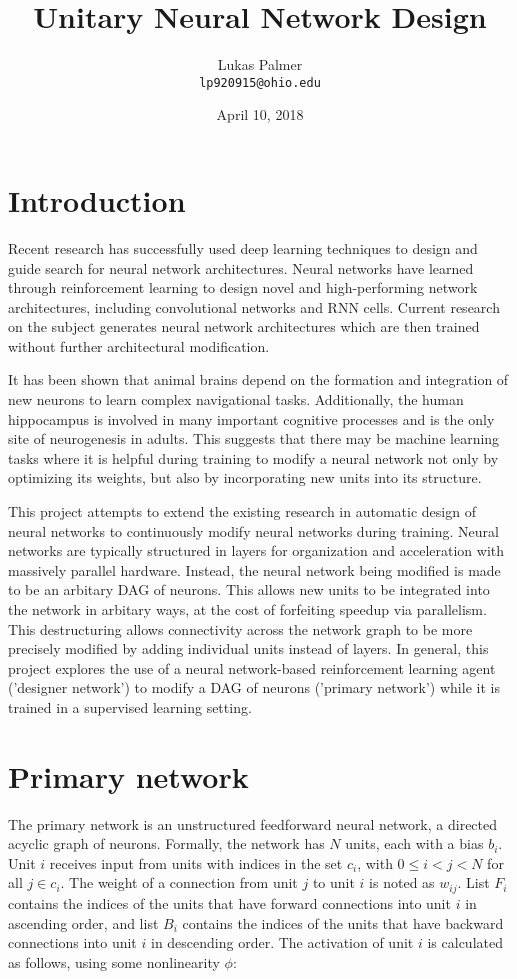 \documentclass{article}[12px]
\title{Unitary Neural Network Design}
\author{Lukas Palmer \\ \texttt{lp920915@ohio.edu}}
\date{April 10, 2018}
\begin{document}
\maketitle

\section{Introduction}

Recent research has successfully used deep learning techniques to design and guide search for neural network architectures. Neural networks have learned through reinforcement learning to design novel and high-performing network architectures, including convolutional networks and RNN cells\cite{DBLP:journals/corr/ZophL16}. Current research on the subject generates neural network architectures which are then trained without further architectural modification.

It has been shown that animal brains depend on the formation and integration of new neurons to learn complex navigational tasks\cite{Dupret08}. Additionally, the human hippocampus is involved in many important cognitive processes and is the only site of neurogenesis in adults. This suggests that there may be machine learning tasks where it is helpful during training to modify a neural network not only by optimizing its weights, but also by incorporating new units into its structure.

This project attempts to extend the existing research in automatic design of neural networks to continuously modify neural networks during training. Neural networks are typically structured in layers for organization and acceleration with massively parallel hardware. Instead, the neural network being modified is made to be an arbitary DAG of neurons. This allows new units to be integrated into the network in arbitary ways, at the cost of forfeiting speedup via parallelism. This destructuring allows connectivity across the network graph to be more precisely modified by adding individual units instead of layers. In general, this project explores the use of a neural network-based reinforcement learning agent ('designer network') to modify a DAG of neurons ('primary network') while it is trained in a supervised learning setting.

\section{Primary network}

The primary network is an unstructured feedforward neural network, a directed acyclic graph of neurons. Formally, the network has \(N\) units, each with a bias \(b_i\). Unit \(i\) receives input from units with indices in the set \(c_i\), with \(0 \le i < j < N\) for all \(j \in c_i\). The weight of a connection from unit \(j\) to unit \(i\) is noted as \(w_{ij}\). List \(F_i\) contains the indices of the units that have forward connections into unit \(i\) in ascending order, and list \(B_i\) contains the indices of the units that have backward connections into unit \(i\) in descending order. The activation of unit \(i\) is calculated as follows, using some nonlinearity \(\phi\):
\end{document}
